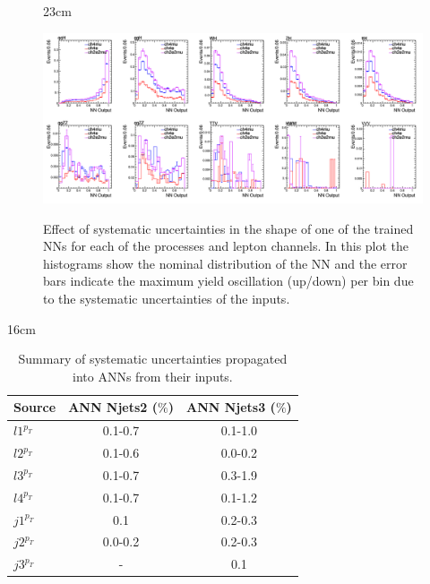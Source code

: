 \begin{landscape}
\begin{figure}[hbtp]{23cm}
	\caption{Effect of systematic uncertainties in the shape of one of the trained NNs for each of the processes and lepton channels. In this plot the histograms show the nominal distribution of the NN and the error bars indicate the maximum yield oscillation (up/down) per bin due to the systematic uncertainties of the inputs.}
	\centering
	\includegraphics[scale=0.55]{ChapterAnalysis/figs/nn_shape_systematic_uncertainty_per_proc_channel}
	\label{fig:nn_systematic_shifts}
\end{figure}
\end{landscape}

\begin{table}[hbtp]{16cm}
	\label{tab:ann_systematic_uncertainties}
	\caption{Summary of systematic uncertainties propagated into ANNs from their inputs.}
	\centering
	\begin{tabular}{lcc}
		\hline
		\rowcolor{light_gray}
		Source       & ANN Njets2 ($\%$) & ANN Njets3 ($\%$)\\
		\hline
		${l1}^{p_{T}}$ & 0.1-0.7           & 0.1-1.0\\
		${l2}^{p_{T}}$ & 0.1-0.6           & 0.0-0.2\\
		${l3}^{p_{T}}$ & 0.1-0.7           & 0.3-1.9\\
		${l4}^{p_{T}}$ & 0.1-0.7           & 0.1-1.2\\
		${j1}^{p_{T}}$ & 0.1               & 0.2-0.3\\
		${j2}^{p_{T}}$ & 0.0-0.2           & 0.2-0.3\\
		${j3}^{p_{T}}$ & -                 & 0.1\\
		\hline
	\end{tabular}
\end{table}

